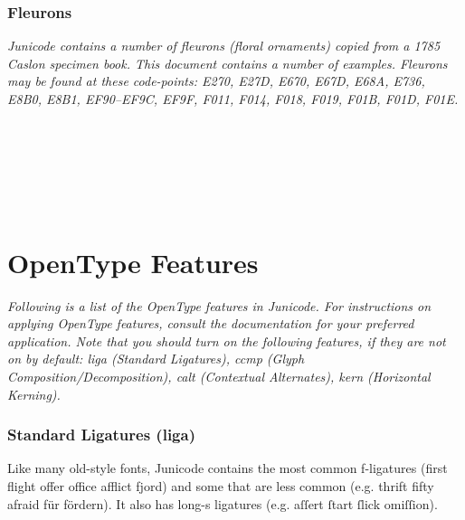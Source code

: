 \documentclass[12pt,a4paper,openany]{book}
\begin{document}
\subsection*{Fleurons}

{\small\itshape Junicode contains a number of fleurons (floral
  ornaments) copied from a 1785 Caslon specimen book. This document
  contains a number of examples. Fleurons may be found at these
  code-points: E270, E27D, E670, E67D, E68A, E736, E8B0, E8B1,
  EF90–EF9C, EF9F, F011, F014, F018, F019, F01B, F01D, F01E.}

\begin{center}
\huge    \\
 \\[0.7ex]
\\[0.7ex]
\\
 
\end{center}

\chapter*{\color{myBlue}OpenType Features}

{\itshape Following is a list of the OpenType features in
  Junicode. For instructions on applying OpenType features, consult
  the documentation for your preferred application. Note that you
  should turn on the following features, if they are not on by
  default: {\upshape liga} (Standard Ligatures), {\upshape ccmp}
  (Glyph Composition/Decomposition), {\upshape calt} (Contextual
  Alternates), {\upshape kern} (Horizontal Kerning).}

\subsection*{Standard Ligatures (liga)}

Like many old-style fonts, Junicode contains the most common f-ligatures
(first flight offer office afflict fjord) and some that are less common
(e.g. thrift fifty afraid für fördern).  It
also has long-s ligatures (e.g. aſſert ſtart ſlick omiſſion).

%
\end{document}
